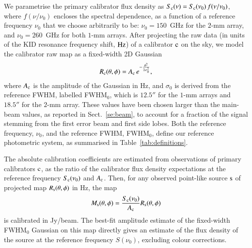 \documentclass[traditionalabstract]{aa}
\newcommand{\lp}[1]{#1}
\begin{document}
{We parametrise the primary calibrator flux density as 
$S_{\rm{c}}(\nu) = S_{\rm{c}}(\nu_0)\, f(\nu/\nu_{0})$, where $f(\nu/\nu_{0})$
encloses the spectral dependence, 
as a function of a reference frequency $\nu_{0}$ that we choose
arbitrarily to be: $\nu_{0} = 150$~GHz for the $2$-mm array, and
$\nu_{0}= 260$~GHz for both $1$-mm arrays. After projecting the raw
data (in units of the KID resonance frequency shift, $\rm Hz$) of a
calibrator $\rm{c}$ on the sky, we model the calibrator raw map as a
fixed-width 2D Gaussian
\begin{equation}
  R_{\rm{c}}(\theta, \phi)  = A_{\rm{c}} \, e^{-\frac{\theta^{2}}{2\sigma_{0}^{2}}},
  \label{eq:gaussian_amplitude}
\end{equation}
{\lp where $A_{\rm{c}}$ is the amplitude of the 
Gaussian in Hz,} and $\sigma_{0}$ is derived from the
reference FWHM, labelled FWHM$_{0}$, which is $12.5''$ for the $1$-mm
arrays and $18.5''$ for the $2$-mm array. These values have
been chosen larger than the main-beam values, as reported in
Sect.~\ref{se:beam}, to account for a fraction of the signal stemming from
the first error beam and first side lobes.
Both the reference frequency, $\nu_0$, and the reference FWHM, FWHM$_{0}$, define
our reference photometric system, as summarised in Table~\ref{tab:definitions}.

The absolute calibration coefficients are estimated from observations
of primary calibrators $\rm{c}$, as the ratio of
the calibrator flux density expectations at the reference frequency
$S_{\rm{c}}(\nu_0)$ and $A_{\rm{c}}$. Then, for any observed point-like source
$\rm{s}$ of projected map $R_{\rm{s}}(\theta,\phi)$ in Hz, the map
\begin{equation}
  M_{\rm{s}}(\theta, \phi) = \frac{S_{\rm{c}} (\nu_{0})}{A_{\rm{c}}}
  R_{\rm{s}}(\theta,\phi)
  \label{eq:pointsourcephot}
\end{equation}
is calibrated in Jy/beam. {\lp The best-fit amplitude estimate
of the fixed-width FWHM$_{0}$ Gaussian on this map directly gives an
estimate of the flux density of the source at the reference
frequency $S(\nu_{0})$, excluding colour corrections.}

}
\end{document}

